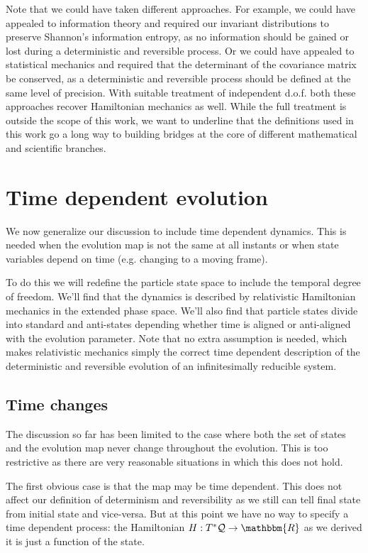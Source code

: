 \documentclass[aps,pra,10pt,twocolumn,floatfix,nofootinbib]{revtex4-1}
\numberwithin{equation}{section}
\theoremstyle{definition}
\begin{document}
Note that we could have taken different approaches. For example, we could have appealed to information theory and required our invariant distributions to preserve Shannon's information entropy, as no information should be gained or lost during a deterministic and reversible process. Or we could have appealed to statistical mechanics and required that the determinant of the covariance matrix be conserved, as a deterministic and reversible process should be defined at the same level of precision. With suitable treatment of independent d.o.f. both these approaches recover Hamiltonian mechanics as well. While the full treatment is outside the scope of this work, we want to underline that the definitions used in this work go a long way to building bridges at the core of different mathematical and scientific branches.

\section{Time dependent evolution}

We now generalize our discussion to include time dependent dynamics. This is needed when the evolution map is not the same at all instants or when state variables depend on time (e.g. changing to a moving frame).

To do this we will redefine the particle state space to include the temporal degree of freedom. We'll find that the dynamics is described by relativistic Hamiltonian mechanics in the extended phase space. We'll also find that particle states divide into standard and anti-states depending whether time is aligned or anti-aligned with the evolution parameter. Note that no extra assumption is needed, which makes relativistic mechanics simply the correct time dependent description of the deterministic and reversible evolution of an infinitesimally reducible system.

\subsection{Time changes}

The discussion so far has been limited to the case where both the set of states and the evolution map never change throughout the evolution. This is too restrictive as there are very reasonable situations in which this does not hold.

The first obvious case is that the map may be time dependent. This does not affect our definition of determinism and reversibility as we still can tell final state from initial state and vice-versa. But at this point we have no way to specify a time dependent process: the Hamiltonian $H: T^*\mathcal{Q} \rightarrow \mathbbm{R}$ as we derived it is just a function of the state.
\end{document}
